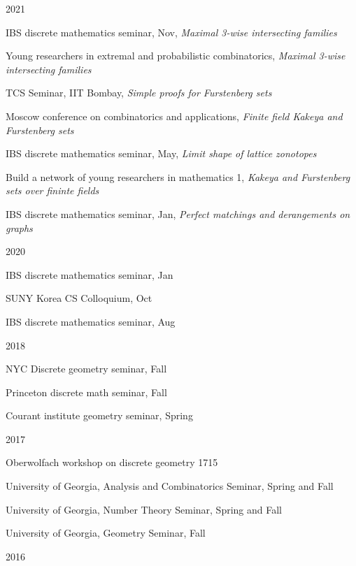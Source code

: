 \documentclass[letterpaper]{article}
\renewenvironment{itemize}{
  \begin{list}{}{
    \setlength{\leftmargin}{1.5em}
  }
}{
  \end{list}
}
\begin{document}
\begin{itemize}
	\item 2021
	\begin{itemize}
		\item IBS discrete mathematics seminar, Nov, {\em Maximal 3-wise intersecting families}
		\item Young researchers in extremal and probabilistic combinatorics, {\em Maximal 3-wise intersecting families}
		\item TCS Seminar, IIT Bombay, {\em Simple proofs for Furstenberg sets}
		\item Moscow conference on combinatorics and applications, {\em Finite field Kakeya and Furstenberg sets}
		\item IBS discrete mathematics seminar, May, {\em Limit shape of lattice zonotopes}
		\item Build a network of young researchers in mathematics 1, {\em Kakeya and Furstenberg sets over fininte fields}
		\item IBS discrete mathematics seminar, Jan, {\em Perfect matchings and derangements on graphs}
	\end{itemize}
	\item 2020
	\begin{itemize}
		\item IBS discrete mathematics seminar, Jan
		\item SUNY Korea CS Colloquium, Oct
		\item IBS discrete mathematics seminar, Aug
\end{itemize}	
\item 2018
\begin{itemize}
	\item NYC Discrete geometry seminar, Fall
	\item Princeton discrete math seminar, Fall
	\item Courant institute geometry seminar, Spring
\end{itemize}
\item 2017
\begin{itemize}
\item Oberwolfach workshop on discrete geometry 1715
\item University of Georgia, Analysis and Combinatorics Seminar, Spring and Fall
\item University of Georgia, Number Theory Seminar, Spring and Fall
\item University of Georgia, Geometry Seminar, Fall
\end{itemize}
\item 2016

\end{itemize}
\end{document}
